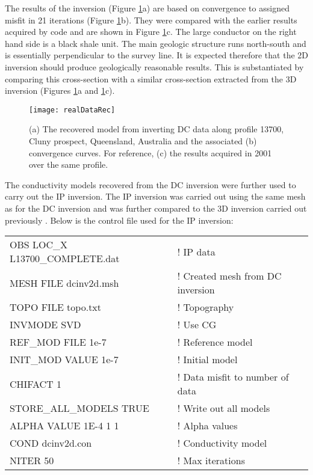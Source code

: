 The results of the inversion (Figure \ref{fig:realDataRec}a) are based on convergence to assigned misfit in 21 iterations (Figure \ref{fig:realDataRec}b). They were compared with the earlier results acquired by  code \cite[]{Rutley01} and are shown in Figure \ref{fig:realDataRec}c. The large conductor on the right hand side is a black shale unit. The main geologic structure runs north-south and is essentially perpendicular to the survey line. It is expected therefore that the 2D inversion should produce geologically reasonable results. This is substantiated by comparing this cross-section with a similar cross-section extracted from the 3D inversion (Figures \ref{fig:realDataRec}a and \ref{fig:realDataRec}c).
%
\begin{figure}
\centering
\texttt{[image: realDataRec]}
\caption{(a) The recovered model from inverting DC data along profile 13700, Cluny prospect, Queensland, Australia and the associated (b) convergence curves. For reference, (c) the  results acquired in 2001 over the same profile.}
\label{fig:realDataRec}
\end{figure}

The conductivity models recovered from the DC inversion were further used to carry out the IP inversion. The IP inversion was carried out using the same mesh as for the DC inversion and was further compared to the 3D inversion carried out previously \cite[]{Rutley01}. Below is the control file used for the IP inversion:
%
\begin{fileExample}
\begin{tabular}{|ll|}
\hline
OBS LOC\_X L13700\_COMPLETE.dat & ! IP data \\
MESH FILE dcinv2d.msh & ! Created mesh from DC inversion\\
TOPO FILE topo.txt & ! Topography\\
INVMODE SVD & ! Use CG \\
REF\_MOD FILE 1e-7 & ! Reference model \\
INIT\_MOD VALUE 1e-7 & ! Initial model \\
CHIFACT 1 & ! Data misfit to number of data \\
STORE\_ALL\_MODELS TRUE & ! Write out all models \\
ALPHA VALUE 1E-4 1 1  & ! Alpha values \\
COND dcinv2d.con & ! Conductivity model \\
NITER 50 & ! Max iterations \\
\hline
\end{tabular}
\end{fileExample}

